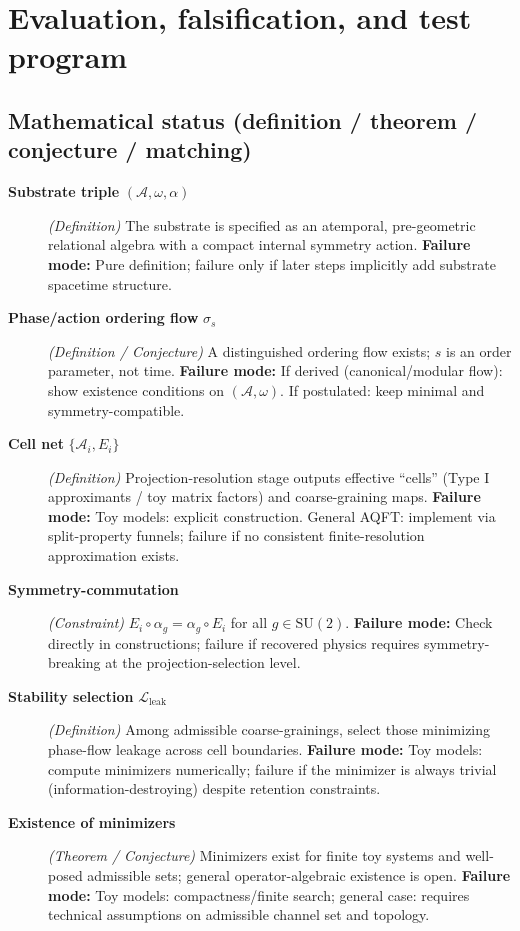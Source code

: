 \documentclass[reprint, amsmath, amssymb, aps, prd]{revtex4-2}
\begin{document}
\section{Evaluation, falsification, and test program}

\subsection{Mathematical status (definition / theorem / conjecture / matching)}

\begin{description}
    \item[\textbf{Substrate triple} $(\mathcal{A},\omega,\alpha)$] \textit{(Definition)} The substrate is specified as an atemporal, pre-geometric relational algebra with a compact internal symmetry action. \textbf{Failure mode:} Pure definition; failure only if later steps implicitly add substrate spacetime structure.
    \item[\textbf{Phase/action ordering flow} $\sigma_s$] \textit{(Definition / Conjecture)} A distinguished ordering flow exists; $s$ is an order parameter, not time. \textbf{Failure mode:} If derived (canonical/modular flow): show existence conditions on $(\mathcal{A},\omega)$. If postulated: keep minimal and symmetry-compatible.
    \item[\textbf{Cell net} $\{\mathcal{A}_i,E_i\}$] \textit{(Definition)} Projection-resolution stage outputs effective ``cells'' (Type I approximants / toy matrix factors) and coarse-graining maps. \textbf{Failure mode:} Toy models: explicit construction. General AQFT: implement via split-property funnels; failure if no consistent finite-resolution approximation exists.
    \item[\textbf{Symmetry-commutation}] \textit{(Constraint)} $E_i\circ\alpha_g=\alpha_g\circ E_i$ for all $g\in \text{SU}(2)$. \textbf{Failure mode:} Check directly in constructions; failure if recovered physics requires symmetry-breaking at the projection-selection level.
    \item[\textbf{Stability selection} $\mathcal{L}_{\text{leak}}$] \textit{(Definition)} Among admissible coarse-grainings, select those minimizing phase-flow leakage across cell boundaries. \textbf{Failure mode:} Toy models: compute minimizers numerically; failure if the minimizer is always trivial (information-destroying) despite retention constraints.
    \item[\textbf{Existence of minimizers}] \textit{(Theorem / Conjecture)} Minimizers exist for finite toy systems and well-posed admissible sets; general operator-algebraic existence is open. \textbf{Failure mode:} Toy models: compactness/finite search; general case: requires technical assumptions on admissible channel set and topology.

\end{description}
\end{document}
